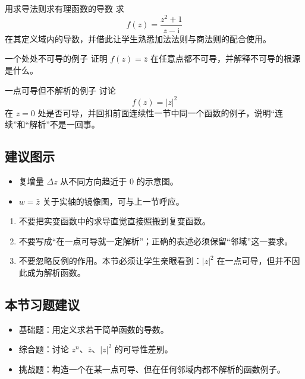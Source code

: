 \begin{lizi}{用求导法则求有理函数的导数}{}
求
\[
    f(z)=\frac{z^2+1}{z-\mathrm{i}}
\]
在其定义域内的导数，并借此让学生熟悉加法法则与商法则的配合使用。
\end{lizi}

\begin{lizi}{一个处处不可导的例子}{}
证明 $f(z)=\bar z$ 在任意点都不可导，并解释不可导的根源是什么。
\end{lizi}

\begin{lizi}{一点可导但不解析的例子}{}
讨论
\[
    f(z)=|z|^2
\]
在 $z=0$ 处是否可导，并回扣前面连续性一节中同一个函数的例子，说明``连续''和``解析''不是一回事。
\end{lizi}

\subsection*{建议图示}
\begin{itemize}
    \item 复增量 $\Delta z$ 从不同方向趋近于 $0$ 的示意图。
    \item $w=\bar z$ 关于实轴的镜像图，可与上一节呼应。
\end{itemize}

\begin{jinshi}[本节易错点]
\begin{enumerate}
    \item 不要把实变函数中的求导直觉直接照搬到复变函数。
    \item 不要写成``在一点可导就一定解析''；正确的表述必须保留``邻域''这一要求。
    \item 不要忽略反例的作用。本节必须让学生亲眼看到：$|z|^2$ 在一点可导，但并不因此成为解析函数。
\end{enumerate}
\end{jinshi}

\subsection*{本节习题建议}
\begin{itemize}
    \item 基础题：用定义求若干简单函数的导数。
    \item 综合题：讨论 $z^n$、$\bar z$、$|z|^2$ 的可导性差别。
    \item 挑战题：构造一个在某一点可导、但在任何邻域内都不解析的函数例子。
\end{itemize}

